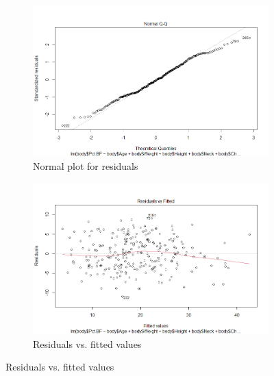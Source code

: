 \documentclass[12pt]{article}
\begin{document}
\begin{figure}
\begin{subfigure}{.45\textwidth}
  \centering
  \includegraphics[width=.8\linewidth]{normqq1.png}  
  \caption{Normal plot for residuals}
  \label{fig:sub-first}
\end{subfigure}
\begin{subfigure}{.45\textwidth}
  \centering
  \includegraphics[width=.8\linewidth]{residvfit1.png}  
  \caption{Residuals vs. fitted values}
  \label{fig:sub-second}
\end{subfigure}

\newline


\end{figure}
\end{document}
